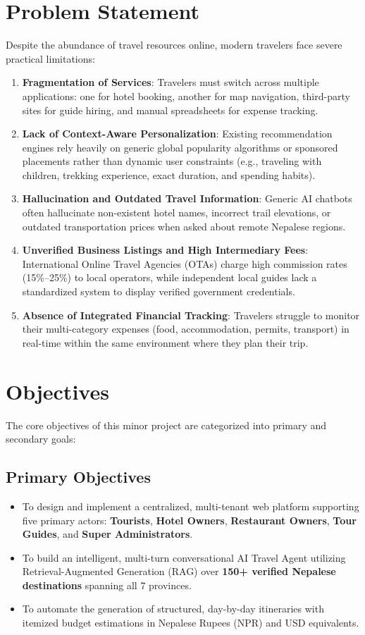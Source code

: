\documentclass[12pt,a4paper]{report}
\begin{document}
\section{Problem Statement}
Despite the abundance of travel resources online, modern travelers face severe practical limitations:
\begin{enumerate}[label=\bfseries\arabic*.]
    \item \textbf{Fragmentation of Services}: Travelers must switch across multiple applications: one for hotel booking, another for map navigation, third-party sites for guide hiring, and manual spreadsheets for expense tracking.
    \item \textbf{Lack of Context-Aware Personalization}: Existing recommendation engines rely heavily on generic global popularity algorithms or sponsored placements rather than dynamic user constraints (e.g., traveling with children, trekking experience, exact duration, and spending habits).
    \item \textbf{Hallucination and Outdated Travel Information}: Generic AI chatbots often hallucinate non-existent hotel names, incorrect trail elevations, or outdated transportation prices when asked about remote Nepalese regions.
    \item \textbf{Unverified Business Listings and High Intermediary Fees}: International Online Travel Agencies (OTAs) charge high commission rates (15\%--25\%) to local operators, while independent local guides lack a standardized system to display verified government credentials.
    \item \textbf{Absence of Integrated Financial Tracking}: Travelers struggle to monitor their multi-category expenses (food, accommodation, permits, transport) in real-time within the same environment where they plan their trip.
\end{enumerate}

\section{Objectives}
The core objectives of this minor project are categorized into primary and secondary goals:

\subsection{Primary Objectives}
\begin{itemize}
    \item To design and implement a centralized, multi-tenant web platform supporting five primary actors: \textbf{Tourists}, \textbf{Hotel Owners}, \textbf{Restaurant Owners}, \textbf{Tour Guides}, and \textbf{Super Administrators}.
    \item To build an intelligent, multi-turn conversational AI Travel Agent utilizing Retrieval-Augmented Generation (RAG) over \textbf{150+ verified Nepalese destinations} spanning all 7 provinces.
    \item To automate the generation of structured, day-by-day itineraries with itemized budget estimations in Nepalese Rupees (NPR) and USD equivalents.
\end{itemize}
\end{document}
